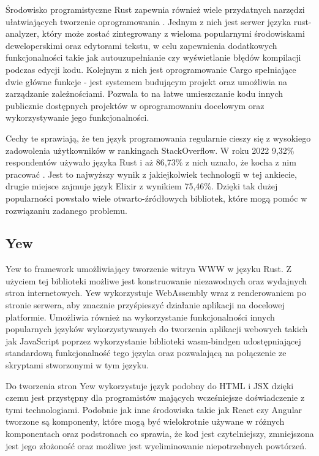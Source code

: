 Środowisko programistyczne Rust zapewnia również wiele przydatnych narzędzi
ułatwiających tworzenie oprogramowania \cite{klabnik:rust}.
Jednym z nich jest serwer języka rust-analyzer, który może zostać zintegrowany
z wieloma popularnymi środowiskami deweloperskimi oraz edytorami tekstu,
w celu zapewnienia dodatkowych funkcjonalności takie jak
autouzupełnianie czy wyświetlanie błędów kompilacji podczas edycji kodu.
Kolejnym z nich jest oprogramowanie Cargo spełniające dwie główne funkcje - 
jest systemem budującym projekt oraz umożliwia na zarządzanie zależnościami.
Pozwala to na łatwe umieszczanie kodu innych publicznie dostępnych projektów
w oprogramowaniu docelowym oraz wykorzystywanie jego funkcjonalności.

Cechy te sprawiają, że ten język programowania regularnie cieszy się z
wysokiego zadowolenia użytkowników w rankingach StackOverflow.
W roku 2022 9,32\% respondentów używało języka Rust i aż 86,73\% z nich
uznało, że kocha z nim pracować \cite{stackoverflow:popularity}.
Jest to najwyższy wynik z jakiejkolwiek technologii w tej ankiecie,
drugie miejsce zajmuje język Elixir z wynikiem 75,46\%.
Dzięki tak dużej popularności powstało wiele otwarto-źródłowych bibliotek,
które mogą pomóc w rozwiązaniu zadanego problemu.

\subsection*{Yew}
Yew to framework umożliwiający tworzenie witryn WWW w języku Rust.
Z użyciem tej biblioteki możliwe jest konstruowanie niezawodnych
oraz wydajnych stron internetowych. Yew wykorzystuje WebAssembly wraz
z renderowaniem po stronie serwera, aby znacznie przyśpieszyć działanie
aplikacji na docelowej platformie. Umożliwia również na wykorzystanie 
funkcjonalności innych popularnych języków wykorzystywanych do tworzenia
aplikacji webowych takich jak JavaScript poprzez wykorzystanie biblioteki
wasm-bindgen udostępniającej standardową funkcjonalność tego języka oraz
pozwalającą na połączenie ze skryptami stworzonymi w tym języku.

Do tworzenia stron Yew wykorzystuje język podobny do HTML i JSX dzięki
czemu jest przystępny dla programistów mających wcześniejsze doświadczenie
z tymi technologiami. Podobnie jak inne środowiska takie jak React czy Angular
tworzone są komponenty, które mogą być wielokrotnie używane w różnych komponentach
oraz podstronach co sprawia, że kod jest czytelniejszy, zmniejszona jest jego złożoność
oraz możliwe jest wyeliminowanie niepotrzebnych powtórzeń.

